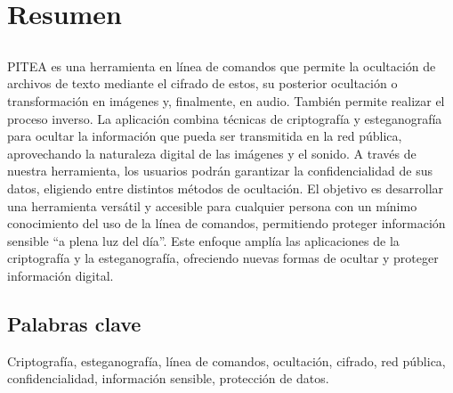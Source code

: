 \chapter*{Resumen}

\section*{\tituloPortadaVal}

PITEA es una herramienta en línea de comandos que permite la ocultación de archivos de texto mediante el cifrado de estos, su posterior ocultación o transformación en imágenes y, finalmente, en audio. También permite realizar el proceso inverso. La aplicación combina técnicas de criptografía y esteganografía para ocultar la información que pueda ser transmitida en la red pública, aprovechando la naturaleza digital de las imágenes y el sonido. 
A través de  nuestra herramienta, los usuarios podrán garantizar la confidencialidad de sus datos, eligiendo entre distintos métodos de ocultación. El objetivo es desarrollar una herramienta versátil y accesible para cualquier persona con un mínimo conocimiento del uso de la línea de comandos, permitiendo proteger información sensible “a plena luz del día”. Este enfoque amplía las aplicaciones de la criptografía y la esteganografía, ofreciendo nuevas formas de ocultar y proteger información digital.



\section*{Palabras clave}
   
\noindent Criptografía, esteganografía, línea de comandos, ocultación, cifrado, red pública, confidencialidad, información sensible, protección de datos.

   


